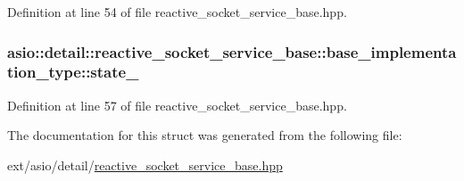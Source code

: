 Definition at line 54 of file reactive\+\_\+socket\+\_\+service\+\_\+base.\+hpp.

\hypertarget{structasio_1_1detail_1_1reactive__socket__service__base_1_1base__implementation__type_a53bbe651bd173ef81d6627468ebabc2d}{}
\subsubsection[{state\+\_\+}]{ asio\+::detail\+::reactive\+\_\+socket\+\_\+service\+\_\+base\+::base\+\_\+implementation\+\_\+type\+::state\+\_\+}\label{structasio_1_1detail_1_1reactive__socket__service__base_1_1base__implementation__type_a53bbe651bd173ef81d6627468ebabc2d}


Definition at line 57 of file reactive\+\_\+socket\+\_\+service\+\_\+base.\+hpp.



The documentation for this struct was generated from the following file\+:\begin{DoxyCompactItemize}
\item 
ext/asio/detail/\hyperlink{reactive__socket__service__base_8hpp}{reactive\+\_\+socket\+\_\+service\+\_\+base.\+hpp}\end{DoxyCompactItemize}
